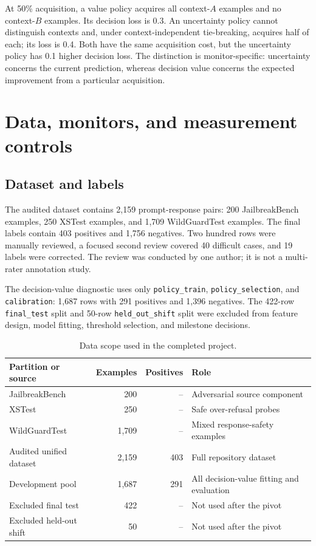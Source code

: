 \documentclass[11pt,a4paper]{article}
\newcommand{\code}[1]{\texttt{#1}}
\begin{document}
At 50\% acquisition, a value policy acquires all context-$A$ examples and no context-$B$ examples. Its decision loss is 0.3. An uncertainty policy cannot distinguish contexts and, under context-independent tie-breaking, acquires half of each; its loss is 0.4. Both have the same acquisition cost, but the uncertainty policy has 0.1 higher decision loss. The distinction is monitor-specific: uncertainty concerns the current prediction, whereas decision value concerns the expected improvement from a particular acquisition.

\section{Data, monitors, and measurement controls}

\subsection{Dataset and labels}

The audited dataset contains 2,159 prompt-response pairs: 200 JailbreakBench examples, 250 XSTest examples, and 1,709 WildGuardTest examples. The final labels contain 403 positives and 1,756 negatives. Two hundred rows were manually reviewed, a focused second review covered 40 difficult cases, and 19 labels were corrected. The review was conducted by one author; it is not a multi-rater annotation study.

The decision-value diagnostic uses only \code{policy\_train}, \code{policy\_selection}, and \code{calibration}: 1,687 rows with 291 positives and 1,396 negatives. The 422-row \code{final\_test} split and 50-row \code{held\_out\_shift} split were excluded from feature design, model fitting, threshold selection, and milestone decisions.

\begin{table}[htbp]
\centering
\caption{Data scope used in the completed project.}
\label{tab:data}
\begin{tabularx}{\textwidth}{@{}lrrY@{}}
\toprule
Partition or source & Examples & Positives & Role \\
\midrule
JailbreakBench & 200 & -- & Adversarial source component \\
XSTest & 250 & -- & Safe over-refusal probes \\
WildGuardTest & 1,709 & -- & Mixed response-safety examples \\
\midrule
Audited unified dataset & 2,159 & 403 & Full repository dataset \\
Development pool & 1,687 & 291 & All decision-value fitting and evaluation \\
Excluded final test & 422 & -- & Not used after the pivot \\
Excluded held-out shift & 50 & -- & Not used after the pivot \\
\bottomrule
\end{tabularx}
\end{table}
\end{document}
